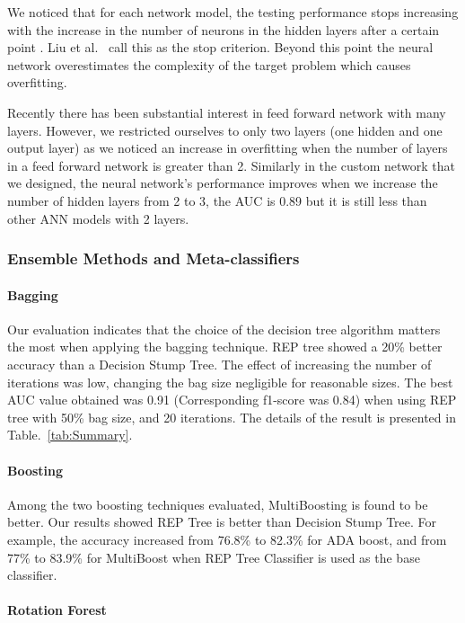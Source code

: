 We noticed that for each network model, the testing performance stops increasing with the increase in the number of neurons in the hidden layers after a certain point . Liu et al.~\cite{NN-Result} call this as the stop criterion. Beyond this point the neural network overestimates the complexity of the target problem which causes overfitting.

Recently there has been substantial interest in feed forward network with many layers. However, we restricted ourselves to only two layers (one hidden and one output layer) as we noticed an increase in overfitting when the number of layers in a feed forward network is greater than 2.  Similarly in the custom network that we designed, the neural network's performance improves when we increase the number of hidden layers from 2 to 3, the AUC is 0.89 but it is still less than other ANN models with 2 layers. 


\subsubsection{Ensemble Methods and Meta-classifiers}

\paragraph{Bagging}

Our evaluation indicates that the choice of the decision tree algorithm matters the most when applying the bagging technique. REP tree showed a 20\% better accuracy than a Decision Stump Tree. The effect of increasing the number of iterations was low, changing the bag size negligible for reasonable sizes. The best AUC value obtained was 0.91 (Corresponding f1-score was 0.84) when using REP tree with 50\% bag size, and 20 iterations. The details of the result is presented in Table.~\ref{tab:Summary}.

\paragraph{Boosting}

Among the two boosting techniques evaluated, MultiBoosting is found to be better. Our results showed REP Tree is better than Decision Stump Tree. For example, the accuracy increased from 76.8\% to 82.3\% for ADA boost, and from 77\% to 83.9\% for MultiBoost when REP Tree Classifier is used as the base classifier.

\paragraph{Rotation Forest}

